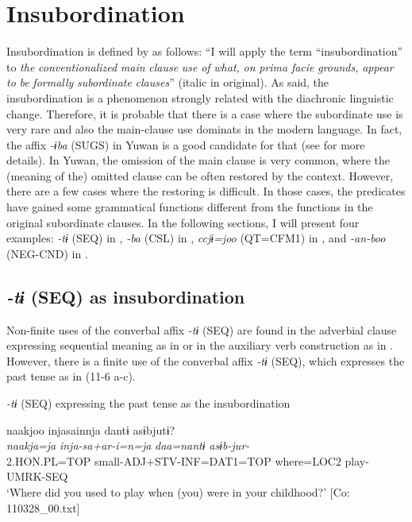 \section{Insubordination}\label{sec:11.2}

Insubordination is defined by \citet[367]{Evans2007} as follows: “I will apply the term “insubordination” to \textit{the} \textit{conventionalized} \textit{main} \textit{clause} \textit{use} \textit{of} \textit{what,} \textit{on} \textit{prima} \textit{facie} \textit{grounds,} \textit{appear} \textit{to} \textit{be} \textit{formally} \textit{subordinate} \textit{clauses}” (italic in original). As \citet[367]{Evans2007} said, the insubordination is a phenomenon strongly related with the diachronic linguistic change. Therefore, it is probable that there is a case where the subordinate use is very rare and also the main-clause use dominats in the modern language. In fact, the affix \textit{{}-ɨba} (SUGS) in Yuwan is a good candidate for that (see  for more details). In Yuwan, the omission of the main clause is very common, where the (meaning of the) omitted clause can be often restored by the context. However, there are a few cases where the restoring is difficult. In those cases, the predicates have gained some grammatical functions different from the functions in the original subordinate clauses. In the following sections, I will present four examples: \textit{-tɨ} (SEQ) in , \textit{{}-ba} (CSL) in , \textit{ccjɨ=joo} (QT=CFM1) in , and \textit{{}-an-boo} (NEG-CND) in .

\subsection{\textit{{}-tɨ} (SEQ) as insubordination}\label{sec:11.2.1}

Non-finite uses of the converbal affix \textit{-tɨ} (SEQ) are found in the adverbial clause expressing sequential meaning as in  or in the auxiliary verb construction as in . However, there is a finite use of the converbal affix \textit{-tɨ} (SEQ), which expresses the past tense as in (11-6 a-c).

\ea\label{ex:11-6}  \textit{{}-tɨ} (SEQ) expressing the past tense as the insubordination

  \ea  
      \glll    naakjoo  injasainnja  dantɨ  asɨbjutɨ?\\    
      \textit{naakja=ja}  \textit{inja-sa+ar-i=n=ja}  \textit{daa=nantɨ} \textit{asɨb-jur-}\\   
      2.HON.PL=TOP  small-ADJ+STV-INF=DAT1=TOP  where=LOC2   play-UMRK-SEQ\\    
      \glt ‘Where did you used to play when (you) were in your childhood?’       [Co: 110328\_00.txt]

